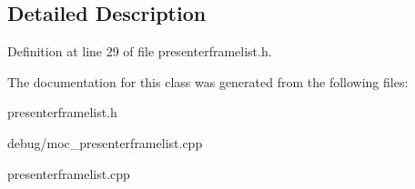 \subsection{Detailed Description}


Definition at line 29 of file presenterframelist.\+h.



The documentation for this class was generated from the following files\+:\begin{DoxyCompactItemize}
\item 
presenterframelist.\+h\item 
debug/moc\+\_\+presenterframelist.\+cpp\item 
presenterframelist.\+cpp\end{DoxyCompactItemize}
